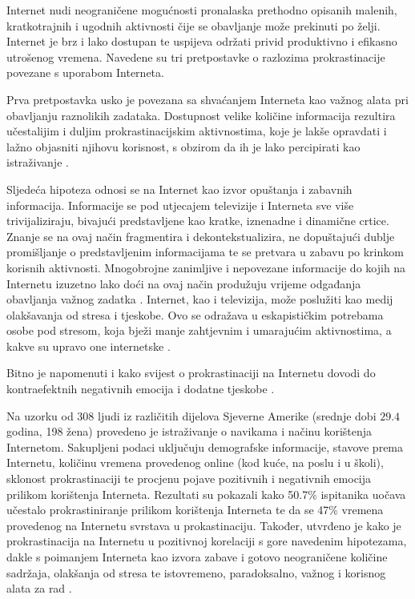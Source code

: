 \documentclass[11pt,twocolumn,english]{article}
\begin{document}
Internet nudi neograničene mogućnosti pronalaska prethodno opisanih malenih,
kratkotrajnih i ugodnih aktivnosti čije se obavljanje može prekinuti po želji.
Internet je brz i lako dostupan te uspijeva održati privid produktivno i efikasno
utrošenog vremena. Navedene su tri pretpostavke o razlozima prokrastinacije
povezane s uporabom Interneta.

Prva pretpostavka usko je povezana sa shvaćanjem Interneta kao važnog alata pri
obavljanju raznolikih zadataka. Dostupnost velike količine informacija rezultira
učestalijim i duljim prokrastinacijskim aktivnostima, koje je lakše opravdati i
lažno objasniti njihovu korisnost, s obzirom da ih je lako percipirati kao
istraživanje \cite{Lavoie01cyberslacking}.

Sljedeća hipoteza odnosi se na Internet kao izvor opuštanja i zabavnih
informacija. Informacije se pod utjecajem televizije i Interneta sve više
trivijaliziraju, bivajući predstavljene kao kratke, iznenadne i dinamične crtice.
Znanje se na ovaj način fragmentira i dekontekstualizira, ne dopuštajući dublje
promišljanje o predstavljenim informacijama te se pretvara u zabavu po krinkom
korisnih aktivnosti.  Mnogobrojne zanimljive i nepovezane informacije do kojih na
Internetu izuzetno lako doći na ovaj način produžuju vrijeme odgađanja obavljanja
važnog zadatka \cite{Postman85amusing}. Internet, kao i televizija, može
poslužiti kao medij olakšavanja od stresa i tjeskobe. Ovo se odražava u
eskapističkim potrebama osobe pod stresom, koja bježi manje zahtjevnim i
umarajućim aktivnostima, a kakve su upravo one internetske
\cite{Lavoie01cyberslacking}.

Bitno je napomenuti i kako svijest o prokrastinaciji na Internetu dovodi do
kontraefektnih negativnih emocija i dodatne tjeskobe \cite{Kraut98internet}.

Na uzorku od 308 ljudi iz različitih dijelova Sjeverne Amerike (srednje dobi
$29.4$ godina, 198 žena) provedeno je istraživanje o navikama i načinu korištenja
Internetom. Sakupljeni podaci uključuju demografske informacije, stavove prema
Internetu, količinu vremena provedenog online (kod kuće, na poslu i u školi),
sklonost prokrastinaciji te procjenu pojave pozitivnih i negativnih emocija
prilikom korištenja Interneta. Rezultati su pokazali kako 50.7\% ispitanika
uočava učestalo prokrastiniranje prilikom korištenja Interneta te da se 47\%
vremena provedenog na Internetu svrstava u prokastinaciju. Također, utvrđeno je
kako je prokrastinacija na Internetu u pozitivnoj korelaciji s gore navedenim
hipotezama, dakle s poimanjem Interneta kao izvora zabave i gotovo neograničene
količine sadržaja, olakšanja od stresa te istovremeno, paradoksalno, važnog i
korisnog alata za rad \cite{Lavoie01cyberslacking}.
\end{document}
